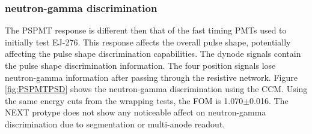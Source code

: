 \subsubsection{neutron-gamma discrimination}
The PSPMT response is different then that of the fast timing PMTs used to initially test EJ-276. This response affects the overall pulse shape, potentially affecting the pulse shape discrimination capabilities. The dynode signals contain the pulse shape discrimination information. The four position signals lose neutron-gamma information after passing through the resistive network. Figure \ref{fig:PSPMTPSD} shows the neutron-gamma discrimination using the CCM. Using the same energy cuts from the wrapping tests, the FOM is 1.070$\pm$0.016. The NEXT protype does not show any noticeable affect on neutron-gamma discrimination due to segmentation or multi-anode readout.


%
%
%
